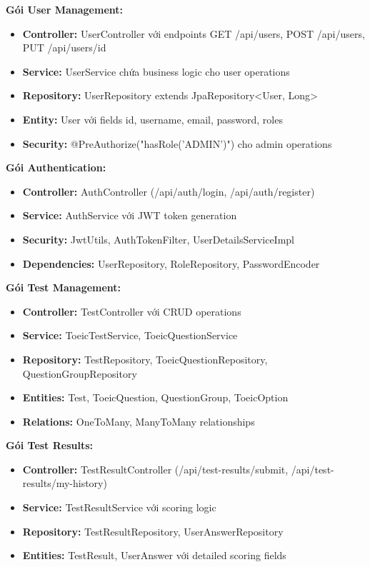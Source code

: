 \documentclass[../DoAn.tex]{subfiles}
\begin{document}
\textbf{Gói User Management:}
\begin{itemize}
    \item \textbf{Controller:} UserController với endpoints GET /api/users, POST /api/users, PUT /api/users/{id}
    \item \textbf{Service:} UserService chứa business logic cho user operations
    \item \textbf{Repository:} UserRepository extends JpaRepository<User, Long>
    \item \textbf{Entity:} User với fields id, username, email, password, roles
    \item \textbf{Security:} @PreAuthorize("hasRole('ADMIN')") cho admin operations
\end{itemize}

\textbf{Gói Authentication:}
\begin{itemize}
    \item \textbf{Controller:} AuthController (/api/auth/login, /api/auth/register)
    \item \textbf{Service:} AuthService với JWT token generation
    \item \textbf{Security:} JwtUtils, AuthTokenFilter, UserDetailsServiceImpl
    \item \textbf{Dependencies:} UserRepository, RoleRepository, PasswordEncoder
\end{itemize}

\textbf{Gói Test Management:}
\begin{itemize}
    \item \textbf{Controller:} TestController với CRUD operations
    \item \textbf{Service:} ToeicTestService, ToeicQuestionService
    \item \textbf{Repository:} TestRepository, ToeicQuestionRepository, QuestionGroupRepository
    \item \textbf{Entities:} Test, ToeicQuestion, QuestionGroup, ToeicOption
    \item \textbf{Relations:} OneToMany, ManyToMany relationships
\end{itemize}

\textbf{Gói Test Results:}
\begin{itemize}
    \item \textbf{Controller:} TestResultController (/api/test-results/submit, /api/test-results/my-history)
    \item \textbf{Service:} TestResultService với scoring logic
    \item \textbf{Repository:} TestResultRepository, UserAnswerRepository
    \item \textbf{Entities:} TestResult, UserAnswer với detailed scoring fields
\end{itemize}
\end{document}
